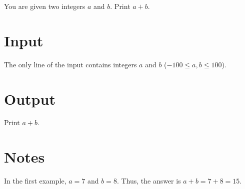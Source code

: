 
You are given two integers $a$ and $b$. Print $a+b$.

\section*{Input}
The only line of the input contains integers $a$ and $b$ ($-100 \le a,b \le 100$).

\section*{Output}
Print $a+b$.

\section*{Notes}
In the first example, $a=7$ and $b=8$. Thus, the answer is $a+b=7+8=15$.
